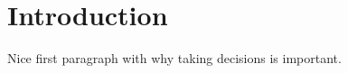\chapter{Introduction}\label{ch:introduction}

Nice first paragraph with why taking decisions is important.